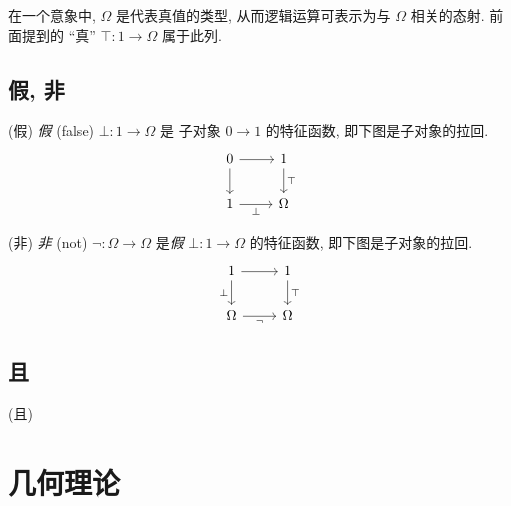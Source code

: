 在一个意象中, $\Omega$ 是代表真值的类型, 从而逻辑运算可表示为与 $\Omega$ 相关的态射. 前面提到的 ``真'' $\top \colon 1 \to \Omega$ 属于此列.

\subsection{假, 非}

\begin{definition}
	{(假)}
	\emph{假} (false) $\bot \colon 1 \to \Omega$ 是 子对象 $0\to 1$ 的特征函数, 即下图是子对象的拉回.
	\[\begin{tikzcd}[ampersand replacement=\&]
		0 \& 1 \\
		1 \& \Omega
		\arrow[from=1-1, to=2-1]
		\arrow[from=1-1, to=1-2]
		\arrow["\bot"', from=2-1, to=2-2]
		\arrow["\top", from=1-2, to=2-2]
	\end{tikzcd}\]
\end{definition}

\begin{definition}
	{(非)}
	\emph{非} (not) $\neg\colon \Omega\to\Omega$ 是\emph{假} $\bot\colon 1 \to\Omega$ 的特征函数, 即下图是子对象的拉回.
	\[\begin{tikzcd}[ampersand replacement=\&]
		1 \& 1 \\
		\Omega \& \Omega
		\arrow["\bot"', from=1-1, to=2-1]
		\arrow[from=1-1, to=1-2]
		\arrow["\neg"', from=2-1, to=2-2]
		\arrow["\top", from=1-2, to=2-2]
	\end{tikzcd}\]
\end{definition}

\subsection{且}

\begin{definition}
	{(且)}
	
\end{definition}



\section{几何理论}







